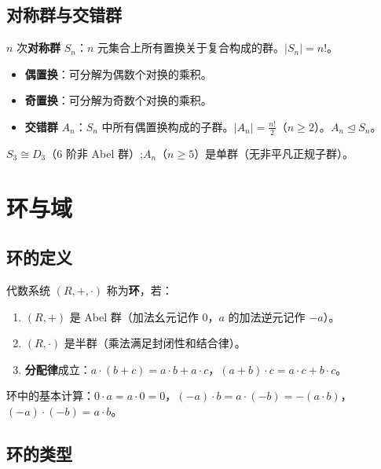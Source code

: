 \subsection{对称群与交错群}

\begin{mydefinition}{}
$n$ 次\textbf{对称群} $S_n$：$n$ 元集合上所有置换关于复合构成的群。$|S_n| = n!$。
\end{mydefinition}

\begin{itemize}
    \item \textbf{偶置换}：可分解为偶数个对换的乘积。
    \item \textbf{奇置换}：可分解为奇数个对换的乘积。
    \item \textbf{交错群} $A_n$：$S_n$ 中所有偶置换构成的子群。$|A_n| = \frac{n!}{2}$（$n\geq 2$）。$A_n \trianglelefteq S_n$。
\end{itemize}

$S_3 \cong D_3$（6 阶非 Abel 群）;$A_n$（$n \geq 5$）是单群（无非平凡正规子群）。

\section{环与域}

\subsection{环的定义}

\begin{mydefinition}{}
代数系统 $(R,+,\cdot)$ 称为\textbf{环}，若：
\begin{enumerate}
    \item $(R,+)$ 是 Abel 群（加法幺元记作 $0$，$a$ 的加法逆元记作 $-a$）。
    \item $(R,\cdot)$ 是半群（乘法满足封闭性和结合律）。
    \item \textbf{分配律}成立：$a\cdot(b+c) = a\cdot b + a\cdot c$，$(a+b)\cdot c = a\cdot c + b\cdot c$。
\end{enumerate}
\end{mydefinition}

环中的基本计算：$0\cdot a = a\cdot 0 = 0$，$(-a)\cdot b = a\cdot (-b) = -(a\cdot b)$，$(-a)\cdot (-b) = a\cdot b$。

\subsection{环的类型}

